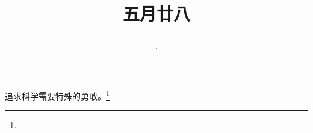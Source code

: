 \title{\date[d=3,m=7,y=2024][year:cn-y,年,month:cn,day:cn,日,·,weekday]·五月廿八 }
追求科学需要特殊的勇敢。\footnote{ }

